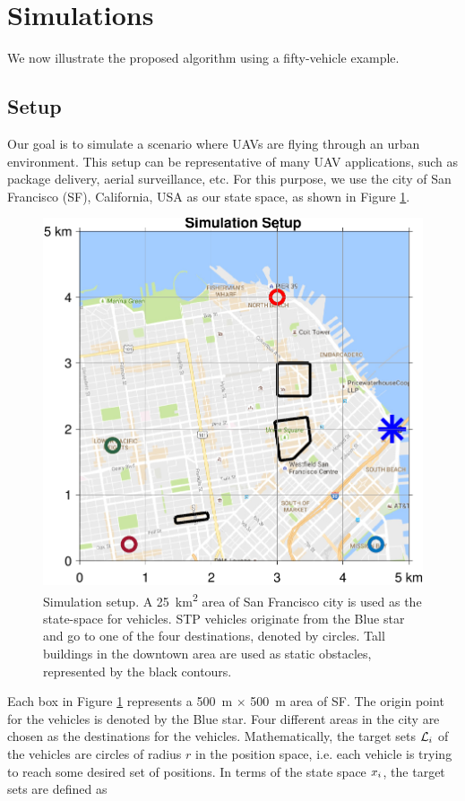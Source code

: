 \section{Simulations \label{sec:simulations}}
We now illustrate the proposed algorithm using a fifty-vehicle example. 

\subsection{Setup \label{sec:simSetup}}
Our goal is to simulate a scenario where UAVs are flying through an urban environment. This setup can be representative of many UAV applications, such as package delivery, aerial surveillance, etc. For this purpose, we use the city of San Francisco (SF), California, USA as our state space, as shown in Figure \ref{fig:sf_setup}. 
\begin{figure}
  \centering
  \includegraphics[width=0.8\columnwidth]{"figs/sf_setup"}
  \caption{Simulation setup. A \SI{25}{\km\squared} area of San Francisco city is used as the state-space for vehicles. STP vehicles originate from the Blue star and go to one of the four destinations, denoted by circles. Tall buildings in the downtown area are used as static obstacles, represented by the black contours.}
  \label{fig:sf_setup}
\end{figure}
Each box in Figure \ref{fig:sf_setup} represents a \SI{500}{\m} $\times$ \SI{500}{\m} area of SF. The origin point for the vehicles is denoted by the Blue star. Four different areas in the city are chosen as the destinations for the vehicles. Mathematically, the target sets $\mathcal{L}_i$ of the vehicles are circles of radius $r$ in the position space, i.e. each vehicle is trying to reach some desired set of positions. In terms of the state space $x_i$, the target sets are defined as

